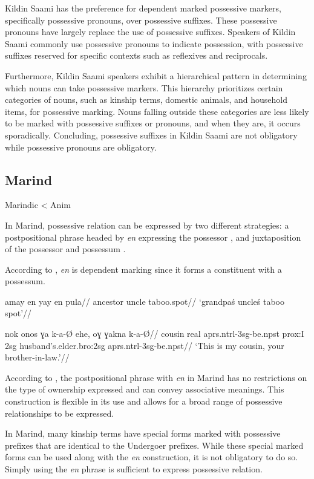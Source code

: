 Kildin Saami has the preference for dependent marked possessive markers, specifically possessive pronouns, over possessive suffixes. These possessive pronouns have largely replace the use of possessive suffixes. Speakers of Kildin Saami commonly use possessive pronouns to indicate possession, with possessive suffixes reserved for specific contexts such as reflexives and reciprocals.

Furthermore, Kildin Saami speakers exhibit a hierarchical pattern in determining which nouns can take possessive markers. This hierarchy prioritizes certain categories of nouns, such as kinship terms, domestic animals, and household items, for possessive marking. Nouns falling outside these categories are less likely to be marked with possessive suffixes or pronouns, and when they are, it occurs sporadically. Concluding, possessive suffixes in Kildin Saami are not obligatory while possessive pronouns are obligatory.

\subsection{Marind}

Marindic < Anim

In Marind, possessive relation can be expressed by two different strategies: a postpositional phrase headed by \textit{en} expressing the possessor , and juxtaposition of the possessor and possessum .

According to \citep[158]{olsson2021grammar}, \textit{en} is dependent marking since it forms a constituent with a possessum.

\ex
\label{marind_en}
\begingl
\gla amay en yay en pula//
\glb ancestor \Poss{} uncle \Poss{} taboo.spot//
\glft `grandpa\'s uncle\'s taboo spot'//
\endgl
\xe

\ex
\label{marind_just}
\begingl
\gla nok onos ɣa k-a-Ø ehe, oɣ ɣakna k-a-Ø//
 cousin real aprs.ntrl-3sg-be.npst prox:I 2sg husband's.elder.bro:2sg aprs.ntrl-3sg-be.npst//
\glft `This is my cousin, your brother-in-law.'//
\endgl
\xe

According to \cite{olsson2021grammar}, the postpositional phrase with \textit{en} in Marind has no restrictions on the type of ownership expressed and can convey associative meanings. This construction is flexible in its use and allows for a broad range of possessive relationships to be expressed.

In Marind, many kinship terms have special forms marked with possessive prefixes that are identical to the Undergoer prefixes. While these special marked forms can be used along with the \textit{en} construction, it is not obligatory to do so. Simply using the \textit{en} phrase is sufficient to express possessive relation.


